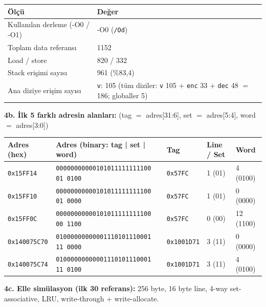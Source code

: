 \documentclass[11pt,a4paper]{article}
\newcommand{\tl}{\texttt}
\newcommand{\hd}[1]{\cellcolor{hdr}#1}
\begin{document}
\begin{longtable}{|p{10.0cm}|p{5.5cm}|}
\hline
\hd{Ölçü} & \hd{Değer}\\
\hline
Kullanılan derleme (-O0 / -O1) & -O0 (\tl{/Od})\\ \hline
Toplam data referansı & 1152\\ \hline
Load / store & 820 / 332\\ \hline
Stack erişimi sayısı & 961 (\%83,4)\\ \hline
Ana diziye erişim sayısı & \tl{v}: 105 (tüm diziler: \tl{v} 105 $+$ \tl{enc} 33 $+$ \tl{dec} 48 $=$ 186; globaller 5)\\ \hline
\end{longtable}

\textbf{4b. İlk 5 farklı adresin alanları:} (tag $=$ adres[31:6], set $=$ adres[5:4], word $=$ adres[3:0])

{\small
\begin{longtable}{|p{2.4cm}|p{6.2cm}|p{1.9cm}|p{2.2cm}|p{2.4cm}|}
\hline
\hd{Adres (hex)} & \hd{Adres (binary: tag | set | word)} & \hd{Tag} & \hd{Line / Set} & \hd{Word}\\
\hline
\tl{0x15FF14} & \tl{00000000000101011111111100 01 0100} & \tl{0x57FC} & 1 (01) & 4 (0100)\\
\hline
\tl{0x15FF10} & \tl{00000000000101011111111100 01 0000} & \tl{0x57FC} & 1 (01) & 0 (0000)\\
\hline
\tl{0x15FF0C} & \tl{00000000000101011111111100 00 1100} & \tl{0x57FC} & 0 (00) & 12 (1100)\\
\hline
\tl{0x140075C70} & \tl{01000000000001110101110001 11 0000} & \tl{0x1001D71} & 3 (11) & 0 (0000)\\
\hline
\tl{0x140075C74} & \tl{01000000000001110101110001 11 0100} & \tl{0x1001D71} & 3 (11) & 4 (0100)\\
\hline
\end{longtable}
}

\textbf{4c. Elle simülasyon (ilk 30 referans):} 256 byte, 16 byte line, 4-way set-associative,
LRU, write-through $+$ write-allocate.
\end{document}
